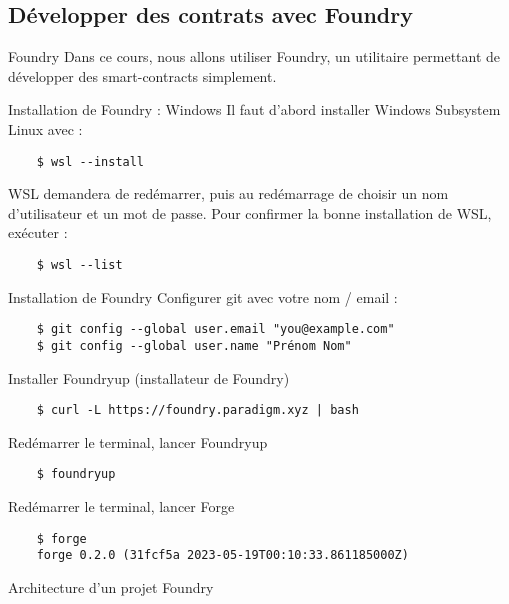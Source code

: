 \subsection{Développer des contrats avec Foundry}

\begin{frame}{Foundry}
  Dans ce cours, nous allons utiliser Foundry, un utilitaire permettant de développer des smart-contracts simplement.
\end{frame}

\begin{frame}[fragile]{Installation de Foundry : Windows}
  Il faut d'abord installer Windows Subsystem Linux avec :
  \begin{verbatim}
    $ wsl --install
  \end{verbatim}

  WSL demandera de redémarrer, puis au redémarrage de choisir un nom d'utilisateur et un mot de passe.
  Pour confirmer la bonne installation de WSL, exécuter :

  \begin{verbatim}
    $ wsl --list
  \end{verbatim}
\end{frame}

\begin{frame}[fragile]{Installation de Foundry}
  Configurer git avec votre nom / email :

  \begin{verbatim}
    $ git config --global user.email "you@example.com"
    $ git config --global user.name "Prénom Nom"
  \end{verbatim}

  Installer Foundryup (installateur de Foundry)
  \begin{verbatim}
    $ curl -L https://foundry.paradigm.xyz | bash
  \end{verbatim}

  Redémarrer le terminal, lancer Foundryup
  \begin{verbatim}
    $ foundryup
  \end{verbatim}

  Redémarrer le terminal, lancer Forge
  \begin{verbatim}
    $ forge
    forge 0.2.0 (31fcf5a 2023-05-19T00:10:33.861185000Z)
  \end{verbatim}
\end{frame}

\begin{frame}{Architecture d'un projet Foundry}
\end{frame}